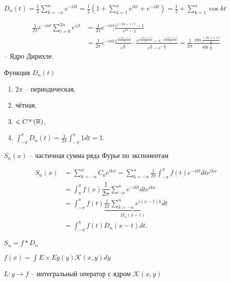 \begin{definition}
    $D_n(t) = \frac{1}{2} \sum_{k=-n}^{n} e^{-ikt} = \frac{1}{2}\left(1 + \sum_{k=1}^{n} e^{ikt} + e^{-ikt}\right) = \frac{1}{2} + \sum_{k=1}^{n} \cos kt$

    \begin{align*}
        \frac{1}{2\pi} e^{-int} \sum_{i=0}^{2n} e^{ijt} &= \frac{1}{2\pi}e^{-int} \frac{e^{i(2n+1)t} - 1}{e^{it} - 1}\\
        &= \frac{1}{2\pi}e^{-int} \frac{e^{\frac{i(2n+1)t}{2}}}{e^{\frac{it}{2}}} \cdot \frac{e^{\frac{i(2n+1)t}{2}} - e^{-\frac{i(2n+1)t}{2}}}{e^{\frac{it}{2}} - e^{-\frac{it}{2}}} = \frac{1}{2\pi} \frac{\sin \frac{(2n+1)t}{2}}{\sin \frac{t}{2}}\end{align*}
    -- Ядро Дирихле.
\end{definition}

\begin{property} Функция $D_n(t)$
    \begin{enumerate}
        \item $2\pi$ -- периодическая,
        \item чётная,
        \item $\in C^{\infty }(\mathbb{R})$,
        \item $\int_{-\pi}^{\pi} D_n(t) = \frac{1}{2\pi} \int_{-\pi}^{\pi}1 dt = 1$.
    \end{enumerate}
\end{property}

\begin{definition}
    $S_n(x)$ -- частичная сумма ряда Фурье по экспонентам

    \begin{align*}
        S_n(x) &= \sum_{k=-n}^{n} C_k e^{ikx} = \sum_{k=-n}^{n} \frac{1}{2\pi} \int_{-\pi}^{\pi} f(t)e^{-ikt}dt e^{ikx} \\
        &=\int_{\pi}^\pi f(x) \dfrac{1}{2\pi}\sum_{-n}^n e ^{-ik t} dt e ^{ik x}\\
        &= \int_{-\pi}^{\pi} f(t) \underbrace{\frac{1}{2\pi} \sum_{k=-n}^{n} e^{i(x-t)k}}_{D_n(x - t)}dt \\
        &= \int_{-\pi}^{\pi} f(t)D_n(x-t)dt.\end{align*}

    $S_n = f\ast D_n$
\end{definition}

\begin{note}
    $f(x) = \int{E\times E} g(y)\mathcal K(x,y)dy$

    $L: g\to f$ -- интегральный оператор с ядром $\mathcal K(x,y)$
\end{note}

